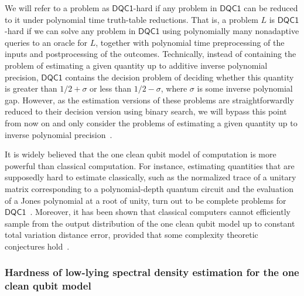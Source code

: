 \documentclass[a4paper, onecolumn, accepted=2022-08-28]{quantumarticle}
\begin{document}
We will refer to a problem as $\mathsf{DQC1}$-hard if any problem in $\mathsf{DQC1}$ can be reduced to it under polynomial time truth-table reductions.
That is, a problem $L$ is $\mathsf{DQC1}$-hard if we can solve any problem in $\mathsf{DQC1}$ using polynomially many nonadaptive queries to an oracle for $L$, together with polynomial time preprocessing of the inputs and postprocessing of the outcomes.
Technically, instead of containing the problem of estimating a given quantity up to additive inverse polynomial precision, $\mathsf{DQC1}$ contains the decision problem of deciding whether this quantity is greater than $1/2 + \sigma$ or less than $1/2 - \sigma$, where $\sigma$ is some inverse polynomial gap.
However, as the estimation versions of these problems are straightforwardly reduced to their decision version using binary search, we will bypass this point from now on and only consider the problems of estimating a given quantity up to inverse polynomial precision~\cite{shor:dqc1}.

It is widely believed that the one clean qubit model of computation is more powerful than classical computation.
For instance, estimating quantities that are supposedly hard to estimate classically, such as the normalized trace of a unitary matrix corresponding to a polynomial-depth quantum circuit and the evaluation of a Jones polynomial at a root of unity, turn out to be complete problems for $\mathsf{DQC1}$~\cite{shor:dqc1}.
Moreover, it has been shown that classical computers cannot efficiently sample from the output distribution of the one clean qubit model up to constant total variation distance error, provided that some complexity theoretic conjectures hold~\cite{tomoyuki:dqc1, tomoyuki:dqc1_k}.

\subsubsection{Hardness of low-lying spectral density estimation for the one clean qubit model
\label{subsec:results}}
\end{document}

